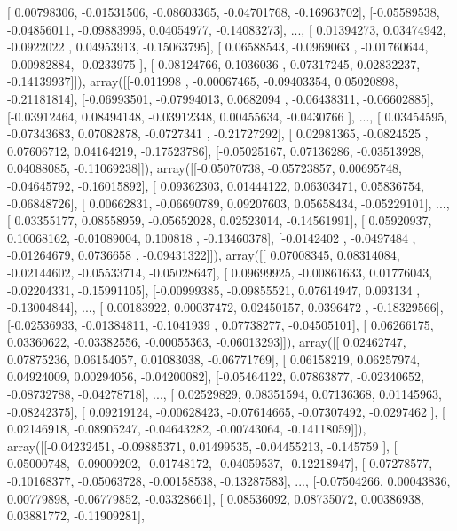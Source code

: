 \documentclass{article}
\begin{document}
       [ 0.00798306, -0.01531506, -0.08603365, -0.04701768, -0.16963702],
       [-0.05589538, -0.04856011, -0.09883995,  0.04054977, -0.14083273],
       ..., 
       [ 0.01394273,  0.03474942, -0.0922022 ,  0.04953913, -0.15063795],
       [ 0.06588543, -0.0969063 , -0.01760644, -0.00982884, -0.0233975 ],
       [-0.08124766,  0.1036036 ,  0.07317245,  0.02832237, -0.14139937]]), array([[-0.011998  , -0.00067465, -0.09403354,  0.05020898, -0.21181814],
       [-0.06993501, -0.07994013,  0.0682094 , -0.06438311, -0.06602885],
       [-0.03912464,  0.08494148, -0.03912348,  0.00455634, -0.0430766 ],
       ..., 
       [ 0.03454595, -0.07343683,  0.07082878, -0.0727341 , -0.21727292],
       [ 0.02981365, -0.0824525 ,  0.07606712,  0.04164219, -0.17523786],
       [-0.05025167,  0.07136286, -0.03513928,  0.04088085, -0.11069238]]), array([[-0.05070738, -0.05723857,  0.00695748, -0.04645792, -0.16015892],
       [ 0.09362303,  0.01444122,  0.06303471,  0.05836754, -0.06848726],
       [ 0.00662831, -0.06690789,  0.09207603,  0.05658434, -0.05229101],
       ..., 
       [ 0.03355177,  0.08558959, -0.05652028,  0.02523014, -0.14561991],
       [ 0.05920937,  0.10068162, -0.01089004,  0.100818  , -0.13460378],
       [-0.0142402 , -0.0497484 , -0.01264679,  0.0736658 , -0.09431322]]), array([[ 0.07008345,  0.08314084, -0.02144602, -0.05533714, -0.05028647],
       [ 0.09699925, -0.00861633,  0.01776043, -0.02204331, -0.15991105],
       [-0.00999385, -0.09855521,  0.07614947,  0.093134  , -0.13004844],
       ..., 
       [ 0.00183922,  0.00037472,  0.02450157,  0.0396472 , -0.18329566],
       [-0.02536933, -0.01384811, -0.1041939 ,  0.07738277, -0.04505101],
       [ 0.06266175,  0.03360622, -0.03382556, -0.00055363, -0.06013293]]), array([[ 0.02462747,  0.07875236,  0.06154057,  0.01083038, -0.06771769],
       [ 0.06158219,  0.06257974,  0.04924009,  0.00294056, -0.04200082],
       [-0.05464122,  0.07863877, -0.02340652, -0.08732788, -0.04278718],
       ..., 
       [ 0.02529829,  0.08351594,  0.07136368,  0.01145963, -0.08242375],
       [ 0.09219124, -0.00628423, -0.07614665, -0.07307492, -0.0297462 ],
       [ 0.02146918, -0.08905247, -0.04643282, -0.00743064, -0.14118059]]), array([[-0.04232451, -0.09885371,  0.01499535, -0.04455213, -0.145759  ],
       [ 0.05000748, -0.09009202, -0.01748172, -0.04059537, -0.12218947],
       [ 0.07278577, -0.10168377, -0.05063728, -0.00158538, -0.13287583],
       ..., 
       [-0.07504266,  0.00043836,  0.00779898, -0.06779852, -0.03328661],
       [ 0.08536092,  0.08735072,  0.00386938,  0.03881772, -0.11909281],
\end{document}
